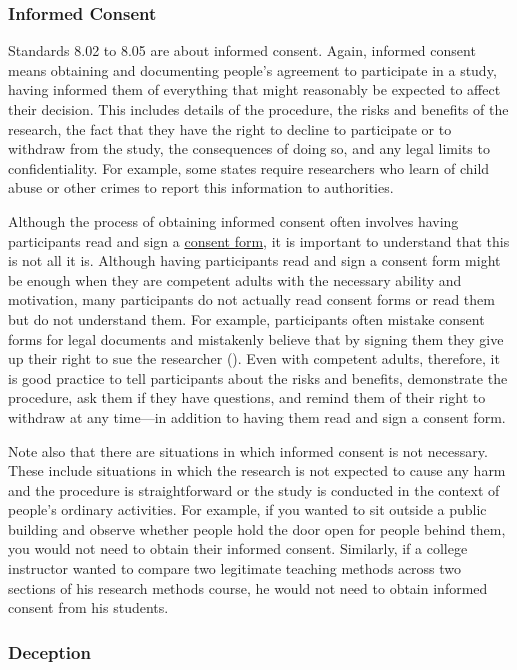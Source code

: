 \documentclass[
]{krantz}
\begin{document}
\subsubsection*{Informed Consent}\label{informed-consent}


Standards 8.02 to 8.05 are about informed consent. Again, informed consent means obtaining and documenting people's agreement to participate in a study, having informed them of everything that might reasonably be expected to affect their decision. This includes details of the procedure, the risks and benefits of the research, the fact that they have the right to decline to participate or to withdraw from the study, the consequences of doing so, and any legal limits to confidentiality. For example, some states require researchers who learn of child abuse or other crimes to report this information to authorities.

Although the process of obtaining informed consent often involves having participants read and sign a \hyperref[consent-form]{consent form}, it is important to understand that this is not all it is. Although having participants read and sign a consent form might be enough when they are competent adults with the necessary ability and motivation, many participants do not actually read consent forms or read them but do not understand them. For example, participants often mistake consent forms for legal documents and mistakenly believe that by signing them they give up their right to sue the researcher (). Even with competent adults, therefore, it is good practice to tell participants about the risks and benefits, demonstrate the procedure, ask them if they have questions, and remind them of their right to withdraw at any time---in addition to having them read and sign a consent form.

Note also that there are situations in which informed consent is not necessary. These include situations in which the research is not expected to cause any harm and the procedure is straightforward or the study is conducted in the context of people's ordinary activities. For example, if you wanted to sit outside a public building and observe whether people hold the door open for people behind them, you would not need to obtain their informed consent. Similarly, if a college instructor wanted to compare two legitimate teaching methods across two sections of his research methods course, he would not need to obtain informed consent from his students.

\subsubsection*{Deception}\label{deception}
\end{document}
